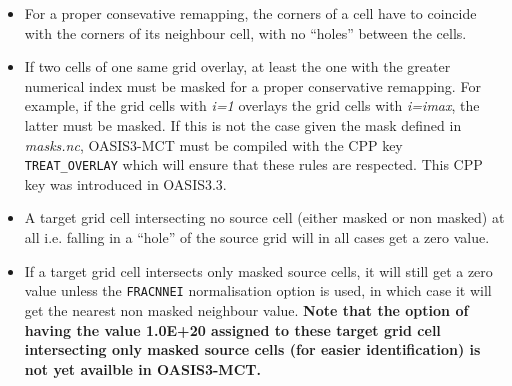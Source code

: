 \begin{itemize}
\begin{itemize}
  \item For a proper consevative remapping, the corners of a cell have
    to coincide with the corners of its neighbour cell, with no
    ``holes'' between the cells.
  
  \item If two cells of one same grid overlay, at least the one with
    the greater numerical index must be masked for a proper
    conservative remapping.  For example, if the grid cells with {\it
      i=1} overlays the grid cells with {\it i=imax}, the latter must
    be masked.  If this is not the case given the mask defined in {\it
      masks.nc}, OASIS3-MCT must be compiled with the CPP key {\tt
      TREAT\_OVERLAY} which will ensure that these rules are
    respected. This CPP key was introduced in OASIS3.3.
      
  \item A target grid cell intersecting no source cell (either masked
    or non masked) at all i.e. falling in a ``hole'' of the source
    grid will in all cases get a zero value.
    
  \item If a target grid cell intersects only masked source cells, it
    will still get a zero value unless the {\tt FRACNNEI}
    normalisation option is used, in which case it will get the
    nearest non masked neighbour value. {\bf Note that the option of
      having the value 1.0E+20 assigned to these target grid cell
      intersecting only masked source cells (for easier
      identification) is not yet availble in OASIS3-MCT.}
   

    
   
  \end{itemize}



\end{itemize}

